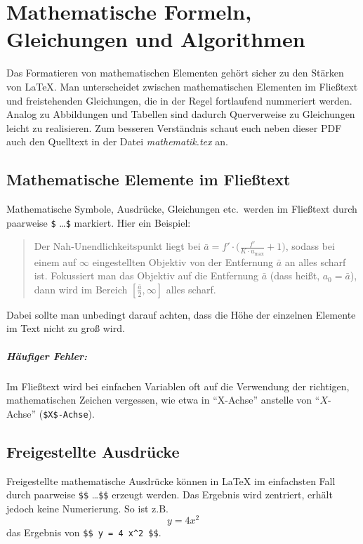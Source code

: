 \chapter[Mathem.\ Formeln etc.]{Mathematische Formeln, Gleichungen und Algorithmen}
\label{chap:Mathematik}


Das Formatieren von mathematischen Elementen gehört sicher zu den
Stär\-ken von LaTeX. Man unterscheidet zwischen mathematischen Elementen
im Fließtext und freistehenden Gleichungen, die in der Regel
fortlaufend nummeriert werden. Analog zu Abbildungen und Tabellen sind dadurch
Querverweise zu Gleichungen leicht zu realisieren. Zum besseren Verständnis schaut euch neben dieser PDF auch den Quelltext in der Datei \emph{mathematik.tex} an.


\section{Mathematische Elemente im Fließtext}

Mathematische Symbole, Ausdrücke, Gleichungen etc.\ werden im Fließtext durch paarweise \verb!$! \ldots \verb!$! markiert. Hier ein Beispiel:
%
\begin{quote}
Der Nah-Unendlichkeitspunkt liegt bei
$\bar{a} = f' \cdot \bigl( \frac{f'}{K \cdot u_{\max}} + 1 \bigr)$,
sodass bei einem auf $\infty$ eingestellten Objektiv von der Entfernung
$\bar{a}$ an alles scharf ist. Fokussiert man das
Objektiv auf die Entfernung $\bar{a}$ (dass heißt, $a_0 = \bar{a}$), dann wird
im Bereich $[\frac{\bar{a}}{2}, \infty]$ alles scharf.
\end{quote}
%
Dabei sollte man unbedingt darauf achten, dass die Höhe der einzelnen Elemente im Text nicht zu groß wird. 

\paragraph{Häufiger Fehler:} 
Im Fließtext wird bei einfachen Variablen oft auf die Verwendung der richtigen, mathematischen Zeichen vergessen, wie etwa in 
"`X-Achse"' anstelle von "`$X$-Achse"' (\verb!$X$-Achse!).



\section{Freigestellte Ausdrücke}

Freigestellte mathematische Ausdrücke können in LaTeX im einfachsten Fall durch paarweise \verb!$$! \ldots \verb!$$! erzeugt werden. Das Ergebnis wird zentriert, erhält jedoch keine Numerierung. So ist z.B.\ $$ y = 4 x^2 $$ das Ergebnis von \verb!$$ y = 4 x^2 $$!.

